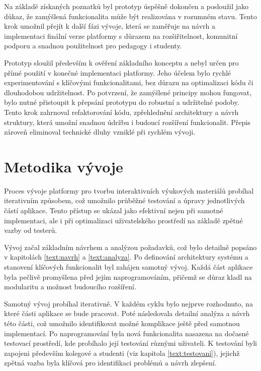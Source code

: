 Na základě získaných poznatků byl prototyp úspěšně dokončen a posloužil jako důkaz, že zamýšlená funkcionalita může být realizována v rozumném stavu. 
Tento krok umožnil přejít k další fázi vývoje, která se zaměřuje na návrh a implementaci finální verze platformy s důrazem na rozšiřitelnost, komunitní podporu a snadnou použitelnost pro pedagogy i studenty.

Prototyp sloužil především k ověření základního konceptu a nebyl určen pro přímé použití v konečné implementaci platformy. 
Jeho účelem bylo rychlé experimentování s klíčovými funkcionalitami, bez důrazu na optimalizaci kódu či dlouhodobou udržitelnost. 
Po potvrzení, že zamýšlené principy mohou fungovat, bylo nutné přistoupit k přepsání prototypu do robustní a udržitelné podoby. 
Tento krok zahrnoval refaktorování kódu, zpřehlednění architektury a návrh struktury, která umožní snadnou údržbu i budoucí rozšíření funkcionalit. 
Přepis zároveň eliminoval technické dluhy vzniklé při rychlém vývoji.


\section{Metodika vývoje}\label{text:realizace/metodikaVyvoje}

Proces vývoje platformy pro tvorbu interaktivních výukových materiálů probíhal iterativním způsobem, což umožnilo průběžné testování a úpravy jednotlivých částí aplikace. 
Tento přístup se ukázal jako efektivní nejen při samotné implementaci, ale i při optimalizaci uživatelského prostředí na základě zpětné vazby od testerů.

Vývoj začal základním návrhem a analýzou požadavků, což bylo detailně popsáno v kapitolách \ref{text:navrh} a \ref{text:analyza}. 
Po definování architektury systému a stanovení klíčových funkcionalit byl zahájen samotný vývoj. 
Každá část aplikace byla pečlivě promyšlena před jejím naprogramováním, přičemž se důraz kladl na modularitu a možnost budoucího rozšíření.

Samotný vývoj probíhal iterativně. 
V každém cyklu bylo nejprve rozhodnuto, na které části aplikace se bude pracovat. 
Poté následovala detailní analýza a návrh této části, což umožnilo identifikovat možné komplikace ještě před samotnou implementací. 
Po naprogramování byla nová funkcionalita nasazena na dočasné testovací prostředí, kde probíhalo její testování různými uživateli. 
K testování byli zapojeni především kolegové a studenti (viz kapitola \ref{text:testovani}), jejichž zpětná vazba byla klíčová pro identifikaci problémů a návrh zlepšení.

